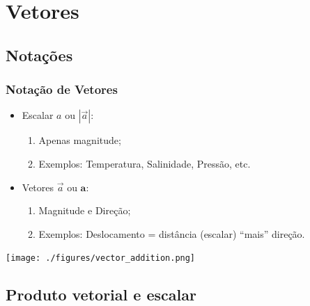 \section{Vetores}

\subsection{Notações}
\begin{frame}
\frametitle{Notação de Vetores}

  \begin{itemize}[<+-| alert@+>]
    \item Escalar $a$ ou $|\vec{a}|$:

    \begin{enumerate}[<+-| alert@+>]
      \item Apenas magnitude;
      \item Exemplos: Temperatura, Salinidade, Pressão, etc.
    \end{enumerate}

    \item Vetores $\vec{a}$ ou $\mathbf{a}$:

    \begin{enumerate}[<+-| alert@+>]
      \item Magnitude e Direção;
      \item Exemplos: Deslocamento = distância (escalar) ``mais'' direção.
    \end{enumerate}
  \end{itemize}
  \pause
    \begin{center}
      \texttt{[image: ./figures/vector\_addition.png]}
    \end{center}
\end{frame}


\subsection{Produto vetorial e escalar}

